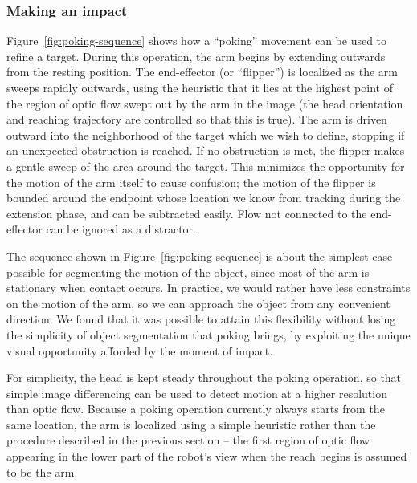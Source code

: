 \subsubsection*{Making an impact}

Figure~\ref{fig:poking-sequence} shows how a ``poking'' movement can
be used to refine a target.  During this operation, the arm begins
by extending outwards from the resting position.  The end-effector (or
``flipper'') is localized as the arm sweeps rapidly outwards, using
the heuristic that it lies at the highest point of the region of optic
flow swept out by the arm in the image (the head orientation and
reaching trajectory are controlled so that this is true).  The arm is
driven outward into the neighborhood of the target which we wish to
define, stopping if an unexpected obstruction is reached.  If no
obstruction is met, the flipper makes a gentle sweep of the area
around the target.  This minimizes the opportunity for the motion of
the arm itself to cause confusion; the motion of the flipper is
bounded around the endpoint whose location we know from tracking
during the extension phase, and can be subtracted easily.  Flow not
connected to the end-effector can be ignored as a distractor.


The sequence shown in Figure~\ref{fig:poking-sequence} is about the
simplest case possible for segmenting the motion of the object, since most of the arm is stationary
when contact occurs.  In practice, we would rather have less
constraints on the motion of the arm, so we can approach the object
from any convenient direction.  We found that it was possible 
to attain this flexibility without losing the simplicity of object
segmentation that poking brings, by exploiting the unique
visual opportunity afforded by the moment of impact.


\ifverbose
For simplicity, the head is kept steady throughout the poking
operation, so that simple image differencing can be used to detect
motion at a higher resolution than optic flow.  Because a poking
operation currently always starts from the same location, the arm
is localized using a simple heuristic rather than the procedure described
in the previous section -- the first region of optic flow appearing
in the lower part of the robot's view when the reach begins
is assumed to be the arm.
\fi

